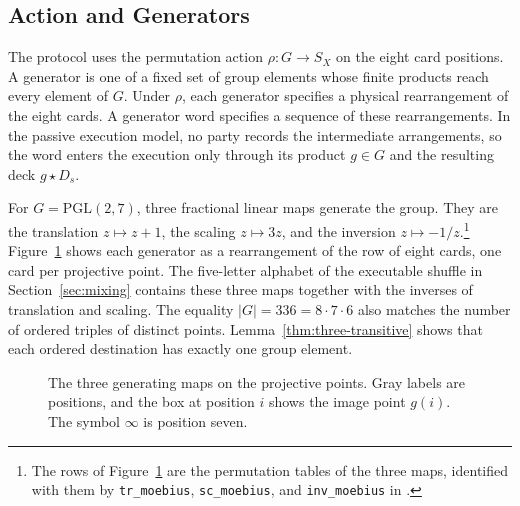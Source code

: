 \documentclass[runningheads]{llncs}
\newcommand{\coqin}[1]{\texttt{#1}}
\newcommand{\PG}{\mathrm{PGL}(2,7)}
\begin{document}
\subsection{Action and Generators}

The protocol uses the permutation action $\rho:G\to S_X$ on the eight card
positions. A generator is one of a fixed set of group elements whose finite
products reach every element of $G$. Under $\rho$, each generator specifies
a physical rearrangement of the eight cards. A generator word specifies a
sequence of these rearrangements. In the passive execution model, no party
records the intermediate arrangements, so the word enters the execution
only through its product $g\in G$ and the resulting deck $g\star D_s$.

For $G=\PG$, three fractional linear maps generate the group. They are the
translation $z\mapsto z+1$, the scaling $z\mapsto 3z$, and the inversion
$z\mapsto -1/z$.\footnote{The rows of Figure~\ref{fig:pgl-generators} are
the permutation tables of the three maps, identified with them by
\coqin{tr\_moebius}, \coqin{sc\_moebius}, and \coqin{inv\_moebius} in
.}
Figure~\ref{fig:pgl-generators} shows each generator as a rearrangement of
the row of eight cards, one card per projective point. The five-letter
alphabet of the executable shuffle in Section~\ref{sec:mixing} contains
these three maps together with the inverses of translation and scaling. The
equality $|G|=336=8\cdot7\cdot6$ also matches the
number of ordered triples of distinct points. Lemma~\ref{thm:three-transitive}
shows that each ordered destination has exactly one group element.

\begin{figure}[t]
  \centering
  \caption{The three generating maps on the projective points. Gray labels
  are positions, and the box at position $i$ shows the image point $g(i)$.
  The symbol $\infty$ is position seven.}
  \label{fig:pgl-generators}
\end{figure}
\end{document}
